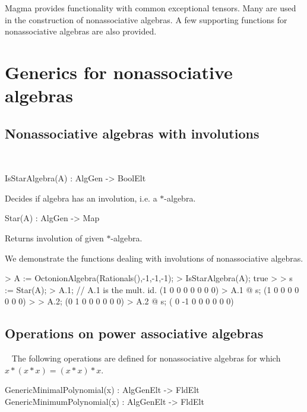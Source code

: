 
Magma provides functionality with common exceptional tensors.  Many are used in the
construction of nonassociative algebras.  A few supporting functions for nonassociative algebras
are also provided.

\section{Generics for nonassociative algebras}

\subsection{Nonassociative algebras with involutions}~

\begin{intrinsics}
IsStarAlgebra(A) : AlgGen -> BoolElt
\end{intrinsics}

Decides if algebra has an involution, i.e. a $*$-algebra.

\begin{intrinsics}
Star(A) : AlgGen -> Map
\end{intrinsics}

Returns involution of given $*$-algebra.

\begin{example}[StarAlgebra]

We demonstrate the functions dealing with involutions of nonassociative algebras.
\begin{code}
> A := OctonionAlgebra(Rationals(),-1,-1,-1);
> IsStarAlgebra(A);
true
> 
> s := Star(A);
> A.1; // A.1 is the mult. id.
(1 0 0 0 0 0 0 0)
> A.1 @ s; 
(1 0 0 0 0 0 0 0)
> 
> A.2;
(0 1 0 0 0 0 0 0)
> A.2 @ s;
( 0 -1  0  0  0  0  0  0)
\end{code}
\end{example}

\subsection{Operations on power associative algebras}~
The following operations are defined for nonassociative algebras for which $x*(x*x)=(x*x)*x$.

\begin{intrinsics}
GenericMinimalPolynomial(x) : AlgGenElt -> FldElt
GenericMinimumPolynomial(x) : AlgGenElt -> FldElt
\end{intrinsics}

